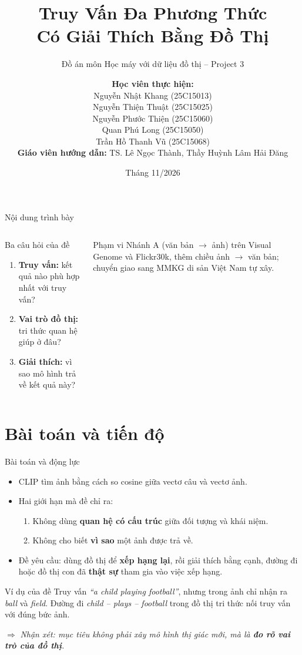 \documentclass[10pt, aspectratio=169]{beamer}
\title[Project 3 · Truy vấn đa phương thức + xAI]{Truy Vấn Đa Phương Thức\\Có Giải Thích Bằng Đồ Thị}
\subtitle{Đồ án môn Học máy với dữ liệu đồ thị -- Project 3}
\author[Nhóm Project 3]{
  \textbf{Học viên thực hiện:}\\
  Nguyễn Nhật Khang (25C15013)\\
  Nguyễn Thiện Thuật (25C15025)\\
  Nguyễn Phước Thiện (25C15060)\\
  Quan Phú Long (25C15050)\\
  Trần Hồ Thanh Vũ (25C15068)\\[1ex]
  \textbf{Giáo viên hướng dẫn:} TS. Lê Ngọc Thành, Thầy Huỳnh Lâm Hải Đăng
}
\institute[KHTN TP.HCM]{Trường Đại Học Khoa Học Tự Nhiên - ĐHQG TP.HCM}
\date{Tháng 11/2026}
\newcommand{\nhanxet}[1]{\par\smallskip$\Rightarrow$ \textit{Nhận xét: #1}}
\begin{document}
\begin{frame}
  \titlepage
\end{frame}

\begin{frame}{Nội dung trình bày}
  \begin{columns}[T]
      \tableofcontents
      \begin{block}{Ba câu hỏi của đề}
        \begin{enumerate}
          \item \textbf{Truy vấn:} kết quả nào phù hợp nhất với truy vấn?
          \item \textbf{Vai trò đồ thị:} tri thức quan hệ giúp ở đâu?
          \item \textbf{Giải thích:} vì sao mô hình trả về kết quả này?
        \end{enumerate}
      \end{block}
      \begin{exampleblock}{Phạm vi}
        Nhánh A (văn bản $\to$ ảnh) trên Visual Genome và Flickr30k, thêm chiều ảnh $\to$ văn bản; chuyển giao sang MMKG di sản Việt Nam tự xây.
      \end{exampleblock}
  \end{columns}
\end{frame}

\section{Bài toán và tiến độ}

\begin{frame}{Bài toán và động lực}
  \begin{itemize}
    \item CLIP tìm ảnh bằng cách so cosine giữa vectơ câu và vectơ ảnh.
    \item Hai giới hạn mà đề chỉ ra:
      \begin{enumerate}
        \item Không dùng \textbf{quan hệ có cấu trúc} giữa đối tượng và khái niệm.
        \item Không cho biết \textbf{vì sao} một ảnh được trả về.
      \end{enumerate}
    \item Đề yêu cầu: dùng đồ thị để \textbf{xếp hạng lại}, rồi giải thích bằng cạnh, đường đi hoặc đồ thị con đã \textbf{thật sự} tham gia vào việc xếp hạng.
  \end{itemize}
  \begin{exampleblock}{Ví dụ của đề}
    Truy vấn \textit{``a child playing football''}, nhưng trong ảnh chỉ nhận ra \textit{ball} và \textit{field}. Đường đi \textit{child -- plays -- football} trong đồ thị tri thức nối truy vấn với đúng bức ảnh.
  \end{exampleblock}
  \nhanxet{mục tiêu không phải xây mô hình thị giác mới, mà là \textbf{đo rõ vai trò của đồ thị}.}
\end{frame}
\end{document}
